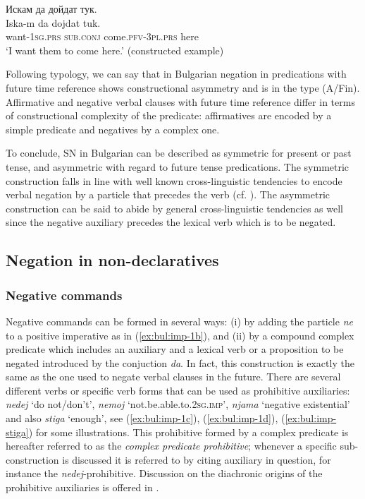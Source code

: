\documentclass[output=paper,colorlinks=true, citecolor=brown]{langscibook}
\begin{document}
\ea  
  Искам да дойдат тук.\\ \label{ex:bul:complex-clause-1}
  	\gll Iska-m da dojdat tuk.\\
     want-1\textsc{sg.prs} \textsc{sub.conj} come.\textsc{pfv}-\textsc{3pl.prs} here\\
\glt `I want them to come here.' (constructed example)

\z


Following  typology, we can say that in Bulgarian negation in predications with future time reference shows constructional asymmetry and is in the type (A\slash Fin). Affirmative and negative verbal clauses with future time reference differ in terms of constructional complexity of the predicate: affirmatives are encoded by a simple predicate and negatives by a complex one. 

To conclude, SN in Bulgarian can be described as symmetric for present or past tense, and asymmetric with regard to future tense predications. The symmetric construction falls in line with well known cross-linguistic tendencies to encode verbal negation by a particle that precedes the verb (cf. \citealt{Dahl1979,Dahl2010,Dryer2013-wals112,Dryer2013-wals143}). The asymmetric construction can be said to abide by general cross-linguistic tendencies as well since the negative auxiliary precedes the lexical verb which is to be negated.

\subsection{Negation in non-declaratives} \label{sec:2.2}
\subsubsection{Negative commands} \label{sec:bul:prohibitives}
Negative commands can be formed in several ways: 
(i) by adding the particle \textit{ne} to a positive imperative as in (\ref{ex:bul:imp-1b}), and (ii) by a compound complex predicate  which includes an auxiliary and a lexical verb or a proposition to be negated introduced by the conjuction \textit{da}. In fact, this construction is exactly the same as the one used to negate verbal clauses in the future. There are several different verbs or specific verb forms that can be used as prohibitive auxiliaries:  \textit{nedej} `do not\slash don't', \textit{nemoj} `not.be.able.to.\textsc{2sg.imp}', \textit{njama} `negative existential' and also \textit{stiga} `enough', see (\ref{ex:bul:imp-1c}), (\ref{ex:bul:imp-1d}), (\ref{ex:bul:imp-stiga}) for some illustrations. This prohibitive formed by a complex predicate is hereafter referred to as the \textit{complex predicate prohibitive}; whenever a specific sub-construction is discussed it is referred to by citing auxiliary in question, for instance the \textit{nedej}-prohibitive. Discussion on the diachronic origins of the prohibitive auxiliaries is offered in .
\end{document}
